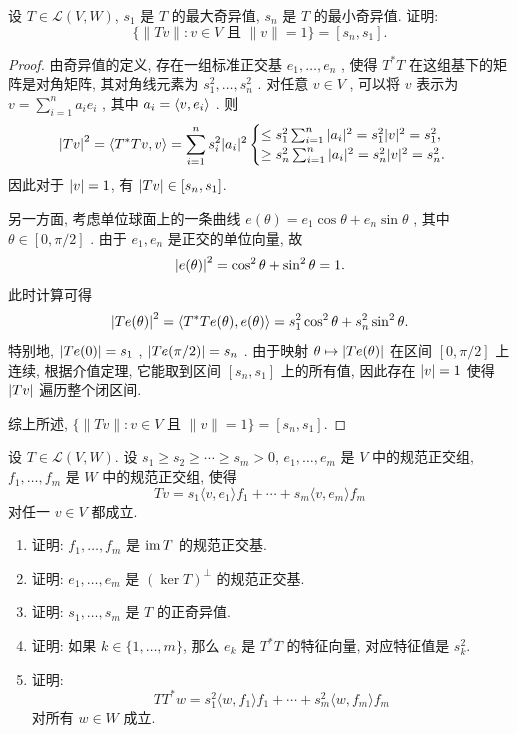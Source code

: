 \documentclass{article}
\begin{document}
\begin{problem}[7E-4]
设 $T \in \mathcal{L}(V, W)$, $s_1$ 是 $T$ 的最大奇异值, $s_n$ 是 $T$ 的最小奇异值. 证明:
\[
\{ \|T v\| : v \in V \text{ 且 } \|v\| = 1 \} = [s_n, s_1].
\]
\end{problem}

\begin{proof}
  由奇异值的定义, 存在一组标准正交基 \( e_1, \ldots, e_n \) , 使得 \( T^*T \) 在这组基下的矩阵是对角矩阵, 其对角线元素为 \( s_1^2, \ldots, s_n^2 \) . 对任意 \( v \in V \) , 可以将 \( v \) 表示为 \( v = \sum_{i=1}^n a_i e_i \) , 其中 \( a_i = \left\langle v, e_i \right\rangle \) . 则
  \[ \left|Tv\right|^2=\left\langle T^*Tv, v \right\rangle= \sum_{i=1}^n s_i^2 |a_i|^2 \begin{cases}
\le s_1^2 \sum_{i=1}^n |a_i|^2 = s_1^2 |v|^2 = s_1^2, \\
\ge s_n^2 \sum_{i=1}^n |a_i|^2 = s_n^2 |v|^2 = s_n^2.
  \end{cases} \]
  因此对于 \( \left|v\right|=1 \), 有 \( \left|Tv\right| \in [s_n, s_1] \).

  另一方面, 考虑单位球面上的一条曲线 \( e(\theta)=e_1\cos\theta+e_n\sin\theta \) , 其中 \( \theta\in[0,\pi/2] \) . 由于 \( e_1, e_n \) 是正交的单位向量, 故 
  \[ \left|e(\theta)\right|^2 = \cos^2\theta+\sin^2\theta = 1. \]
  此时计算可得
  \[ \left|Te(\theta)\right|^2 = \left\langle T^*Te(\theta), e(\theta) \right\rangle = s_1^2\cos^2\theta + s_n^2\sin^2\theta. \]
  特别地, \( \left|Te(0)\right|=s_1 \) , \( \left|Te(\pi/2)\right|=s_n \) . 由于映射 \( \theta\mapsto \left|Te(\theta)\right| \) 在区间 \( [0,\pi/2] \) 上连续, 根据介值定理, 它能取到区间 \( [s_n, s_1] \) 上的所有值, 因此存在 \( \left|v\right|=1 \) 使得 \( \left|Tv\right| \) 遍历整个闭区间.
  
  综上所述, \( \{ \|T v\| : v \in V \text{ 且 } \|v\| = 1 \} = [s_n, s_1] \).
\end{proof}



\begin{problem}[7E-8]
设 $T \in \mathcal{L}(V, W)$. 设 $s_1 \ge s_2 \ge \cdots \ge s_m > 0$, $e_1, \ldots, e_m$ 是 $V$ 中的规范正交组, $f_1, \ldots, f_m$ 是 $W$ 中的规范正交组, 使得
\[
T v = s_1 \langle v, e_1 \rangle f_1 + \cdots + s_m \langle v, e_m \rangle f_m
\]
对任一 $v \in V$ 都成立.
\begin{enumerate}[label=(\alph*)]
\item 证明: $f_1, \ldots, f_m$ 是 $\operatorname{im} T$ 的规范正交基.
\item 证明: $e_1, \ldots, e_m$ 是 $(\ker T)^\perp$ 的规范正交基.
\item 证明: $s_1, \ldots, s_m$ 是 $T$ 的正奇异值.
\item 证明: 如果 $k \in \{1, \ldots, m\}$, 那么 $e_k$ 是 $T^* T$ 的特征向量, 对应特征值是 $s_k^2$.
\item 证明:
\[
T T^* w = s_1^2 \langle w, f_1 \rangle f_1 + \cdots + s_m^2 \langle w, f_m \rangle f_m
\]
对所有 $w \in W$ 成立.
\end{enumerate}
\end{problem}
\end{document}
